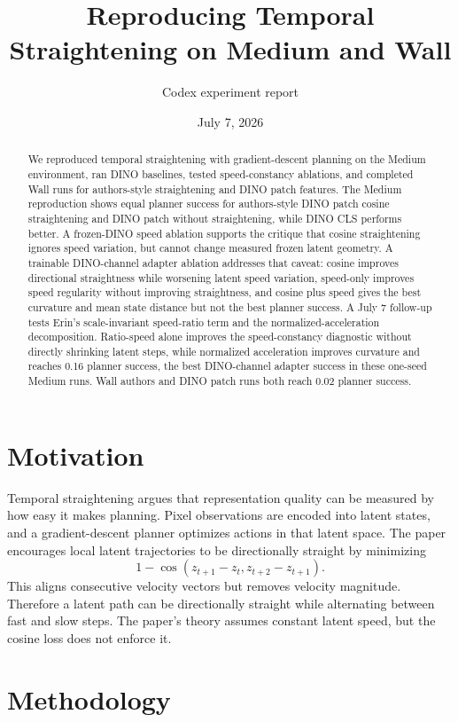\documentclass[11pt]{article}
\title{Reproducing Temporal Straightening on Medium and Wall}
\author{Codex experiment report}
\date{July 7, 2026}
\begin{document}
\maketitle

\begin{abstract}
We reproduced temporal straightening with gradient-descent planning on the Medium environment, ran DINO baselines, tested speed-constancy ablations, and completed Wall runs for authors-style straightening and DINO patch features. The Medium reproduction shows equal planner success for authors-style DINO patch cosine straightening and DINO patch without straightening, while DINO CLS performs better. A frozen-DINO speed ablation supports the critique that cosine straightening ignores speed variation, but cannot change measured frozen latent geometry. A trainable DINO-channel adapter ablation addresses that caveat: cosine improves directional straightness while worsening latent speed variation, speed-only improves speed regularity without improving straightness, and cosine plus speed gives the best curvature and mean state distance but not the best planner success. A July 7 follow-up tests Erin's scale-invariant speed-ratio term and the normalized-acceleration decomposition. Ratio-speed alone improves the speed-constancy diagnostic without directly shrinking latent steps, while normalized acceleration improves curvature and reaches 0.16 planner success, the best DINO-channel adapter success in these one-seed Medium runs. Wall authors and DINO patch runs both reach 0.02 planner success.
\end{abstract}

\section{Motivation}

Temporal straightening argues that representation quality can be measured by how easy it makes planning. Pixel observations are encoded into latent states, and a gradient-descent planner optimizes actions in that latent space. The paper encourages local latent trajectories to be directionally straight by minimizing
\[
  1 - \cos(z_{t+1} - z_t, z_{t+2} - z_{t+1}).
\]
This aligns consecutive velocity vectors but removes velocity magnitude. Therefore a latent path can be directionally straight while alternating between fast and slow steps. The paper's theory assumes constant latent speed, but the cosine loss does not enforce it.

\section{Methodology}
\end{document}
